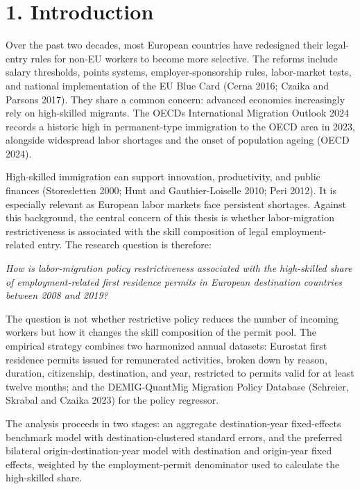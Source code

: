 \documentclass[11pt,a4paper]{article}
\begin{document}
\clearpage
\tableofcontents
\clearpage
\listoftables
\vspace{1.5em}
\listoffigures

\clearpage
\section{1. Introduction}\label{introduction}\begingroup{}

Over the past two decades, most European countries have redesigned their
legal-entry rules for non-EU workers to become more selective. The
reforms include salary thresholds, points systems, employer-sponsorship
rules, labor-market tests, and national implementation of the EU Blue
Card (Cerna 2016; Czaika and Parsons 2017). They share a common concern:
advanced economies increasingly rely on high-skilled migrants. The
OECD\textquotesingle s International Migration Outlook 2024 records a
historic high in permanent-type immigration to the OECD area in 2023,
alongside widespread labor shortages and the onset of population ageing
(OECD 2024).

High-skilled immigration can support innovation, productivity, and
public finances (Storesletten 2000; Hunt and Gauthier-Loiselle 2010;
Peri 2012). It is especially relevant as European labor markets face
persistent shortages. Against this background, the central concern of
this thesis is whether labor-migration restrictiveness is associated
with the skill composition of legal employment-related entry. The
research question is therefore:

\emph{How is labor-migration policy restrictiveness associated with the
high-skilled share of employment-related first residence permits in
European destination countries between 2008 and 2019?}

The question is not whether restrictive policy reduces the number of
incoming workers but how it changes the skill composition of the permit
pool. The empirical strategy combines two harmonized annual datasets:
Eurostat first residence permits issued for remunerated activities,
broken down by reason, duration, citizenship, destination, and year,
restricted to permits valid for at least twelve months; and the
DEMIG-QuantMig Migration Policy Database (Schreier, Skrabal and Czaika
2023) for the policy regressor.

The analysis proceeds in two stages: an aggregate destination-year
fixed-effects benchmark model with destination-clustered standard
errors, and the preferred bilateral origin-destination-year model with
destination and origin-year fixed effects, weighted by the
employment-permit denominator used to calculate the high-skilled share.
\end{document}

